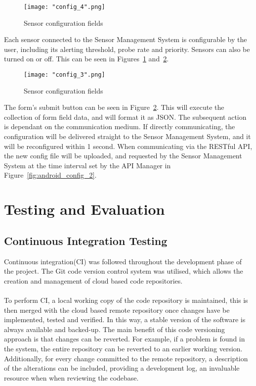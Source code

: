 \documentclass{article}
\begin{document}
\begin{figure}[H]
\centering
\texttt{[image: "config\_4".png]}
\caption{Sensor configuration fields}
\label{fig:android_config_3}
\end{figure}

\noindent
Each sensor connected to the Sensor Management System is configurable by the user, including its alerting threshold, probe rate and priority. Sensors can also be turned on or off. This can be seen in Figures~\ref{fig:android_config_3} and~\ref{fig:android_config_4}.

\begin{figure}[H]
\centering
\texttt{[image: "config\_3".png]}
\caption{Sensor configuration fields}
\label{fig:android_config_4}
\end{figure}

\noindent
The form\rq s submit button can be seen in Figure~\ref{fig:android_config_4}. This will execute the collection of form field data, and will format it as JSON. The subsequent action is dependant on the communication medium. If directly communicating, the configuration will be delivered straight to the Sensor Management System, and it will be reconfigured within 1 second. When communicating via the RESTful API, the new config file will be uploaded, and requested by the Sensor Management System at the time interval set by the API Manager in Figure~\ref{fig:android_config_2}.


\section{Testing and Evaluation}
\subsection{Continuous Integration Testing}
Continuous integration(CI) was followed throughout the development phase of the project. The Git code version control system was utilised, which allows the creation and management of cloud based code repositories. \\\\
To perform CI, a local working copy of the code repository is maintained, this is then merged with the cloud based remote repository once changes have be implemented, tested and verified. In this way, a stable version of the software is always available and backed-up. The main benefit of this code versioning approach is that changes can be reverted. For example, if a problem is found in the system, the entire repository can be reverted to an earlier working version. Additionally, for every change committed to the remote repository, a description of the alterations can be included, providing a development log, an invaluable resource when when reviewing the codebase. 
\end{document}
